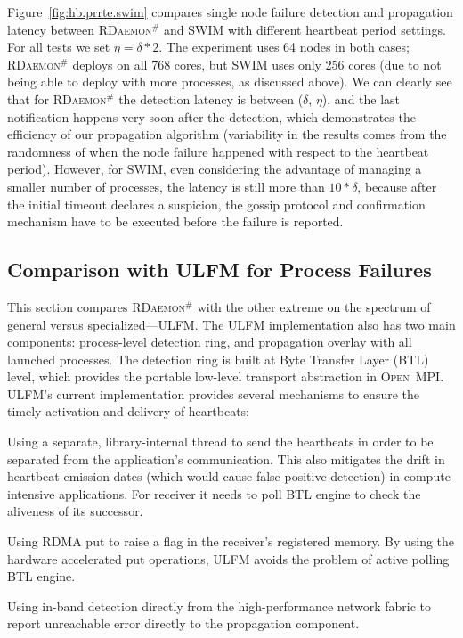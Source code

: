 \documentclass[5p,times,twocolumn]{elsarticle}
\newcommand{\ompi}[0]{\textsc{Open~MPI}\xspace}
\newcommand{\ulfm}[0]{\textsc{ULFM}\xspace}
\newcommand{\ourwork}[0]{\textsc{RDaemon}\ensuremath{^\#}\xspace}
\begin{document}
Figure~\ref{fig:hb.prrte.swim} compares single node failure detection and propagation latency between \ourwork and SWIM
with different heartbeat period settings. For all tests we set $ \eta = \delta * 2 $. The
experiment uses 64 nodes in both cases; \ourwork deploys on all 768 cores, but SWIM uses only
256 cores (due to not being able to deploy with more processes, as discussed above).
 We can clearly see that for \ourwork the detection latency is between ($\delta$, $\eta$), and the last notification happens very soon after the detection, which demonstrates the efficiency of our propagation algorithm (variability in the results comes from the randomness of when the node failure happened with respect to the heartbeat period). However, for SWIM, even considering the advantage of managing a
 smaller number of processes, the latency is still more than $10*\delta$, because after the initial timeout declares a suspicion, the gossip protocol and confirmation mechanism have to be executed
before the failure is reported.

\subsection{Comparison with \ulfm for Process Failures}
This section compares \ourwork with the other extreme on the spectrum of
general versus specialized---\ulfm. The \ulfm implementation also has two
 main components: process-level detection ring, and propagation overlay with all launched processes. The detection ring is built at Byte Transfer Layer (BTL) level, which provides the portable low-level transport abstraction in \ompi. \ulfm's current implementation provides several mechanisms to ensure the timely activation and delivery of heartbeats:
\begin{compactenum}
  \item Using a separate, library-internal thread to send the heartbeats in order to be separated from the application's communication. This also mitigates the drift in heartbeat
  emission dates (which would cause false positive detection) in compute-intensive applications.
  For receiver it needs to poll BTL engine to check the aliveness of its successor.
  \item Using RDMA put to raise a flag in the receiver's registered memory. By using the hardware accelerated put operations, \ulfm avoids the problem of active polling BTL engine.
  \item Using in-band detection directly from the high-performance network
  fabric to report unreachable error directly to the propagation component.
\end{compactenum}
\end{document}
